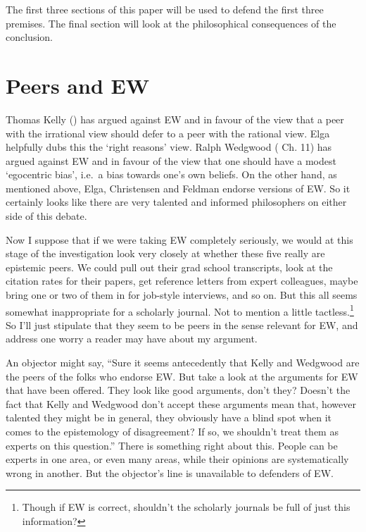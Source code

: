 \documentclass[
  11pt,
  letterpaper,
  DIV=11,
  numbers=noendperiod,
  twoside]{scrartcl}
\begin{document}
The first three sections of this paper will be used to defend the first
three premises. The final section will look at the philosophical
consequences of the conclusion.

\section{Peers and EW}\label{peers-and-ew}

Thomas Kelly () has argued against
EW and in favour of the view that a peer with the irrational view should
defer to a peer with the rational view. Elga helpfully dubs this the
`right reasons' view. Ralph Wedgwood
( Ch. 11) has argued against EW
and in favour of the view that one should have a modest `egocentric
bias', i.e.~a bias towards one's own beliefs. On the other hand, as
mentioned above, Elga, Christensen and Feldman endorse versions of EW.
So it certainly looks like there are very talented and informed
philosophers on either side of this debate.

Now I suppose that if we were taking EW completely seriously, we would
at this stage of the investigation look very closely at whether these
five really are epistemic peers. We could pull out their grad school
transcripts, look at the citation rates for their papers, get reference
letters from expert colleagues, maybe bring one or two of them in for
job-style interviews, and so on. But this all seems somewhat
inappropriate for a scholarly journal. Not to mention a little
tactless.\footnote{Though if EW is correct, shouldn't the scholarly
  journals be full of just this information?} So I'll just stipulate
that they seem to be peers in the sense relevant for EW, and address one
worry a reader may have about my argument.

An objector might say, ``Sure it seems antecedently that Kelly and
Wedgwood are the peers of the folks who endorse EW. But take a look at
the arguments for EW that have been offered. They look like good
arguments, don't they? Doesn't the fact that Kelly and Wedgwood don't
accept these arguments mean that, however talented they might be in
general, they obviously have a blind spot when it comes to the
epistemology of disagreement? If so, we shouldn't treat them as experts
on this question.'' There is something right about this. People can be
experts in one area, or even many areas, while their opinions are
systematically wrong in another. But the objector's line is unavailable
to defenders of EW.
\end{document}
